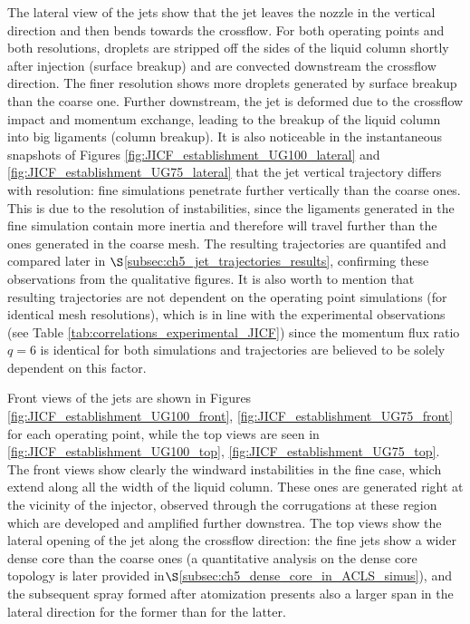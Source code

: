 The lateral view of the jets show that the jet leaves the nozzle in the vertical direction and then bends towards the crossflow. For both operating points and both resolutions, droplets are stripped off the sides of the liquid column shortly after injection (surface breakup) and are convected downstream the crossflow direction. The finer resolution shows more droplets generated by surface breakup than the coarse one. Further downstream, the jet is deformed due to the crossflow impact and momentum exchange, leading to the breakup of the liquid column into big ligaments (column breakup). It is also noticeable in the instantaneous snapshots of Figures \ref{fig:JICF_establishment_UG100_lateral} and \ref{fig:JICF_establishment_UG75_lateral} that the jet vertical trajectory differs with resolution: fine simulations penetrate further vertically than the coarse ones. This is due to the resolution of instabilities, since the ligaments generated in the fine simulation contain more inertia and therefore will travel further than the ones generated in the coarse mesh. The resulting trajectories are quantifed and compared later in $\S$\ref{subsec:ch5_jet_trajectories_results}, confirming these observations from the qualitative figures. It is also worth to mention that resulting trajectories are not dependent on the operating point simulations (for identical mesh resolutions), which is in line with the experimental observations (see Table \ref{tab:correlations_experimental_JICF}) since the momentum flux ratio $q = 6$ is identical for both simulations and trajectories are believed to be solely dependent on this factor.

Front views of the jets are shown in Figures \ref{fig:JICF_establishment_UG100_front}, \ref{fig:JICF_establishment_UG75_front} for each operating point, while the top views are seen in \ref{fig:JICF_establishment_UG100_top}, \ref{fig:JICF_establishment_UG75_top}. The front views show clearly the windward instabilities in the fine case, which extend along all the width of the liquid column. These ones are generated right at the vicinity of the injector, observed through the corrugations at these region which are developed and amplified further downstrea. The top views show the lateral opening of the jet along the crossflow direction: the fine jets show a wider dense core than the coarse ones (a quantitative analysis on the dense core topology is later provided in$\S$\ref{subsec:ch5_dense_core_in_ACLS_simus}), and the subsequent spray formed after atomization presents also a larger span in the lateral direction for the former than for the latter.



